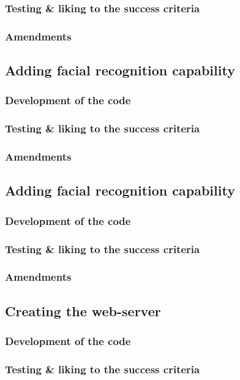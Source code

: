 \documentclass[9pt]{article}
\begin{document}
\subsubsection{Testing \& liking to the success criteria}
\subsubsection{Amendments}


\subsection{Adding facial recognition capability}
\subsubsection{Development of the code}
\subsubsection{Testing \& liking to the success criteria}
\subsubsection{Amendments}


\subsection{Adding facial recognition capability}
\subsubsection{Development of the code}
\subsubsection{Testing \& liking to the success criteria}
\subsubsection{Amendments}


\subsection{Creating the web-server}
\subsubsection{Development of the code}
\subsubsection{Testing \& liking to the success criteria}
\end{document}
